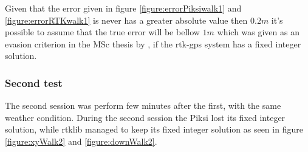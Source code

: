 Given that the error given in figure \ref{figure:errorPiksiwalk1} and \ref{figure:errorRTKwalk1} is never has a greater absolute value then $0.2m$ it's possible to assume that the true error will be bellow $1m$ which was given as an evasion criterion in the MSc thesis by \citep{Froelich}, if the \gls{rtk-gps} system has a fixed integer solution.
\subsubsection{Second test}
The second session was perform few minutes after the first, with the same weather condition.
During the second session the Piksi lost its fixed integer solution, while \gls{rtklib} managed to keep its fixed integer solution as seen in figure \ref{figure:xyWalk2} and \ref{figure:downWalk2}.

